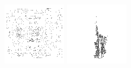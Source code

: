 \documentclass{article}
\begin{document}
\begin{figure}[!b]
\begin{minipage}[c]{.21\linewidth}
  \end{minipage}
  \begin{minipage}[c]{.21\linewidth}
    \centering\centerline{\includegraphics[width=\linewidth]{imgs/dennis_cal/dollar/sums/497_995.png}}
  \end{minipage}
  \begin{minipage}[c]{.21\linewidth}
    \centering\centerline{\includegraphics[width=\linewidth]{imgs/dennis_cal/saxophone/sums/497_995.png}}

\end{minipage}
\end{figure}
\end{document}
